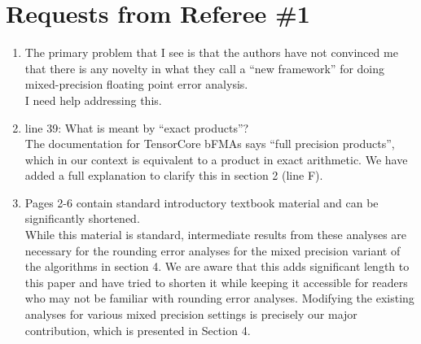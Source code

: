 \documentclass[10pt]{article}
\begin{document}
\section*{Requests from Referee \#1}
\begin{enumerate}\bfseries
	\item The primary problem that I see is that the authors have not convinced me that there is any novelty in what they call a ``new framework'' for doing mixed-precision floating point error analysis.\\
	{\normalfont I need help addressing this.}
	\item line 39: What is meant by ``exact products''? \\
	{\normalfont 
	The documentation for TensorCore bFMAs says ``full precision products'', which in our context is equivalent to a product in exact arithmetic.
	We have added a full explanation to clarify this in section 2 (line F). 
	}
	\item Pages 2-6 contain standard introductory textbook material and can be significantly shortened. \\
	{\normalfont
	While this material is standard, intermediate results from these analyses are necessary for the rounding error analyses for the mixed precision variant of the algorithms in section 4.
	We are aware that this adds significant length to this paper and have tried to shorten it while keeping it accessible for readers who may not be familiar with rounding error analyses.
	Modifying the existing analyses for various mixed precision settings is precisely our major contribution, which is presented in Section 4.
	}
\end{enumerate}
\end{document}
